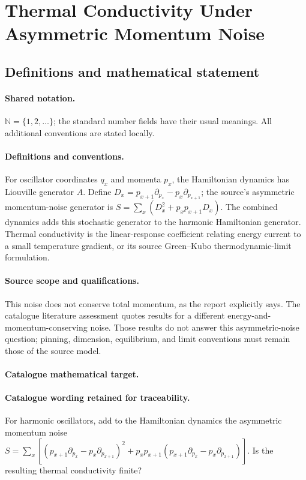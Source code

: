 \documentclass[11pt]{article}
\begin{document}
\section{Thermal Conductivity Under Asymmetric Momentum Noise}\label{statement}

\subsection{Definitions and mathematical statement}

\paragraph{Shared notation.}$\mathbb N=\{1,2,\ldots\}$; the standard number fields have their usual meanings. All additional conventions are stated locally.


\paragraph{Definitions and conventions.} For oscillator coordinates $q_x$ and momenta $p_x$, the Hamiltonian dynamics has Liouville generator $A$. Define $D_x=p_{x+1}\partial_{p_x}-p_x\partial_{p_{x+1}}$; the source's asymmetric momentum-noise generator is $S=\sum_x(D_x^2+p_xp_{x+1}D_x)$. The combined dynamics adds this stochastic generator to the harmonic Hamiltonian generator. Thermal conductivity is the linear-response coefficient relating energy current to a small temperature gradient, or its source Green--Kubo thermodynamic-limit formulation.

\paragraph{Source scope and qualifications.} This noise does not conserve total momentum, as the report explicitly says. The catalogue literature assessment quotes results for a different energy-and-momentum-conserving noise. Those results do not answer this asymmetric-noise question; pinning, dimension, equilibrium, and limit conventions must remain those of the source model.

\paragraph{Catalogue mathematical target.}
\paragraph{Catalogue wording retained for traceability.}
For harmonic oscillators, add to the Hamiltonian dynamics the asymmetric momentum noise $S=\sum_x[(p_{x+1}\partial_{p_x}-p_x\partial_{p_{x+1}})^2+p_xp_{x+1}(p_{x+1}\partial_{p_x}-p_x\partial_{p_{x+1}})]$. Is the resulting thermal conductivity finite?
\end{document}
